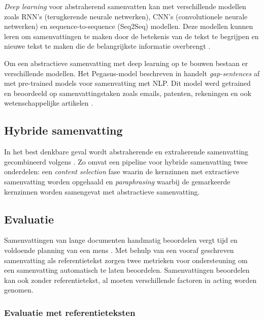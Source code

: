 \textit{Deep learning} voor abstraherend samenvatten kan met verschillende modellen zoals RNN’s (terugkerende neurale netwerken), CNN’s (convolutionele neurale netwerken) en sequence-to-sequence (Seq2Seq) modellen. Deze modellen kunnen leren om samenvattingen te maken door de betekenis van de tekst te begrijpen en nieuwe tekst te maken die de belangrijkste informatie overbrengt \autocite{Suleiman2020}.

Om een abstractieve samenvatting met deep learning op te bouwen bestaan er verschillende modellen. Het Pegasus-model beschreven in \textcite{Zhang2020} handelt \textit{gap-sentences} af met pre-trained models voor samenvatting met NLP.  Dit model werd getrained en beoordeeld op samenvattingstaken zoals emails, patenten, rekeningen en ook wetenschappelijke artikelen \autocite{Zhang2020}.




\subsection{Hybride samenvatting}

In het best denkbare geval wordt abstraherende en extraherende samenvatting gecombineerd volgens \textcite{Hsu2018, Huang2019}. Zo omvat een pipeline voor hybride samenvatting twee onderdelen: een \textit{content selection} fase waarin de kernzinnen met extractieve samenvatting worden opgehaald en \textit{paraphrasing} waarbij de gemarkeerde kernzinnen worden samengevat met abstractieve samenvatting. 

\subsection{Evaluatie}

Samenvattingen van lange documenten handmatig beoordelen vergt tijd en voldoende planning van een mens \autocite{Nenkova2004}. Met behulp van een vooraf geschreven samenvatting als referentietekst zorgen twee metrieken voor ondersteuning om een samenvatting automatisch te laten beoordelen. Samenvattingen beoordelen kan ook zonder referentietekst, al moeten verschillende factoren in acting worden genomen.

\subsubsection{Evaluatie met referentieteksten}

